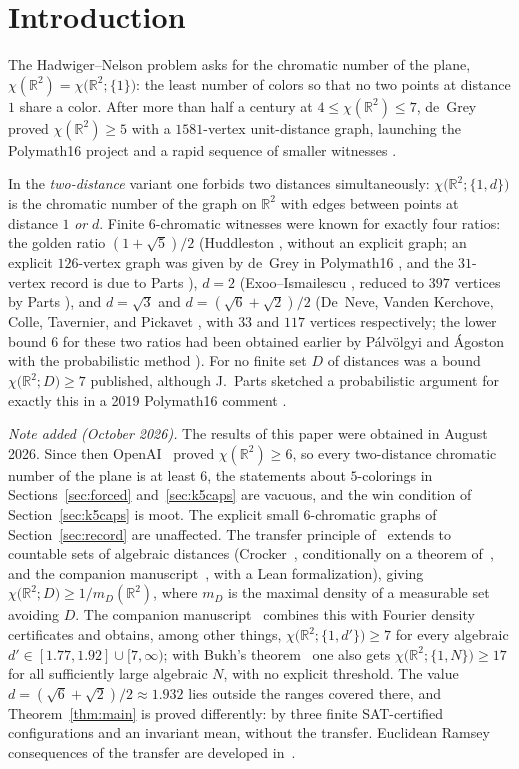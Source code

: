 \documentclass[11pt]{article}
\theoremstyle{definition}
\theoremstyle{remark}
\newcommand{\R}{\mathbb{R}}
\newcommand{\dd}{d}                          %
\newcommand{\chid}[1]{\chi\bigl(\R^2;#1\bigr)}
\begin{document}
\section{Introduction}\label{sec:intro}

The Hadwiger--Nelson problem asks for the chromatic number of the plane,
$\chi(\R^2)=\chid{\{1\}}$: the least number of colors so that no two points
at distance $1$ share a color.  After more than half a century at
$4\le\chi(\R^2)\le 7$, de~Grey \cite{deGrey18} proved $\chi(\R^2)\ge 5$
with a $1581$-vertex unit-distance graph, launching the Polymath16 project
\cite{Polymath16} and a rapid sequence of smaller witnesses
\cite{Heule18,ExooIsmailescu18,Parts20b}.

In the \emph{two-distance} variant one forbids two distances
simultaneously: $\chid{\{1,\dd\}}$ is the chromatic number of the graph on
$\R^2$ with edges between points at distance $1$ \emph{or} $\dd$.  Finite
$6$-chromatic witnesses were known for exactly four ratios: the golden
ratio $(1+\sqrt5)/2$ (Huddleston \cite{OTH08}, without an explicit
graph; an explicit $126$-vertex graph was given by de~Grey in
Polymath16 \cite{Polymath16}, and the $31$-vertex record is due to Parts
\cite{Parts20a}), $\dd=2$
(Exoo--Ismailescu \cite{ExooIsmailescu20}, reduced to $397$ vertices by
Parts \cite{Parts20a}), and $\dd=\sqrt3$ and $\dd=(\sqrt6+\sqrt2)/2$
(De~Neve, Vanden Kerchove, Colle, Tavernier, and Pickavet
\cite{DeNeve25}, with $33$ and $117$ vertices respectively; the lower
bound $6$ for these two ratios had been obtained earlier by
P\'alv\"olgyi and \'Agoston with the probabilistic method
\cite{PalvolgyiAgoston19}).  For no finite set $D$ of distances was a
bound $\chid{D}\ge 7$ published, although J.~Parts sketched a
probabilistic argument for exactly this in a 2019 Polymath16 comment
\cite{Parts19}.

\emph{Note added (October 2026).} The results of this paper were
obtained in August 2026.  Since then OpenAI~\cite{OAI} proved
$\chi(\R^2)\ge6$, so every two-distance chromatic number of the plane is
at least $6$, the statements about $5$-colorings in
Sections~\ref{sec:forced} and~\ref{sec:k5caps} are vacuous, and the win
condition of Section~\ref{sec:k5caps} is moot.  The explicit small
$6$-chromatic graphs of Section~\ref{sec:record} are unaffected.  The
transfer principle of~\cite{OAI} extends to countable sets of algebraic
distances (Crocker~\cite{Crocker}, conditionally on a theorem
of~\cite{OAI}, and the companion manuscript~\cite{BassR3}, with a Lean
formalization), giving $\chid{D}\ge 1/m_D(\R^2)$, where $m_D$ is the
maximal density of a measurable set avoiding $D$.  The companion
manuscript~\cite{BassMono} combines this with Fourier density
certificates and obtains, among other things, $\chid{\{1,\dd'\}}\ge7$
for every algebraic $\dd'\in[1.77,1.92]\cup[7,\infty)$; with Bukh's
theorem~\cite{Bukh} one also gets $\chid{\{1,N\}}\ge17$ for all
sufficiently large algebraic $N$, with no explicit threshold.  The value
$\dd=(\sqrt6+\sqrt2)/2\approx1.932$ lies outside the ranges covered
there, and Theorem~\ref{thm:main} is proved differently: by three finite
SAT-certified configurations and an invariant mean, without the
transfer.  Euclidean Ramsey consequences of the transfer are developed
in~\cite{BassRamsey}.
\end{document}
